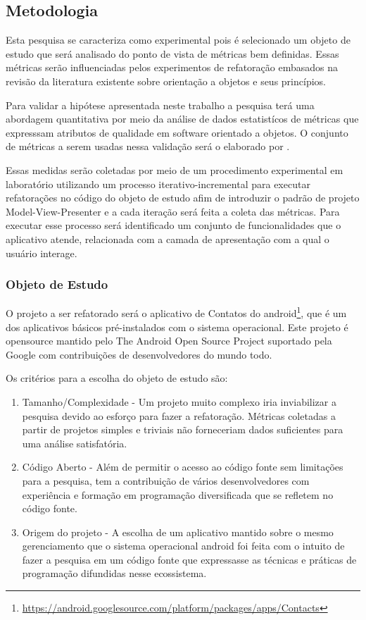 \documentclass[conference]{IEEEtran}
\begin{document}
\subsection{Metodologia}

Esta pesquisa se caracteriza como experimental pois é selecionado um objeto
de estudo que será analisado do ponto de vista de métricas bem definidas. Essas
métricas serão influenciadas pelos experimentos de refatoração embasados na
revisão da literatura existente sobre orientação a objetos e seus princípios.

Para validar a hipótese apresentada neste trabalho a pesquisa terá uma
abordagem quantitativa por meio da análise de dados estatistícos de métricas 
que expresssam atributos de qualidade em software orientado a objetos. O
conjunto de métricas a serem usadas nessa validação será o elaborado por
\cite{cksuite}.

Essas medidas serão coletadas por meio de um procedimento experimental em
laboratório utilizando um processo iterativo-incremental para executar
refatorações no código do objeto de estudo afim de introduzir o padrão de
projeto Model-View-Presenter e a cada iteração será feita a coleta das
métricas. Para executar esse processo será identificado um conjunto de
funcionalidades que o aplicativo atende, relacionada com a camada de
apresentação com a qual o usuário interage.

\subsubsection{Objeto de Estudo}


O projeto a ser refatorado será o aplicativo de Contatos do
android\footnote{\url{https://android.googlesource.com/platform/packages/apps/Contacts}},
que é um dos aplicativos básicos pré-instalados com o sistema operacional. Este
projeto é opensource mantido pelo  The Android Open Source Project suportado
pela Google com contribuições de desenvolvedores do mundo todo.

Os critérios para a escolha do objeto de estudo são:

\begin{enumerate}
  \item Tamanho/Complexidade - Um projeto muito complexo iria inviabilizar a
  pesquisa devido ao esforço para fazer a refatoração. Métricas coletadas
  a partir de projetos simples e triviais não forneceriam dados suficientes para
  uma análise satisfatória.
  \item Código Aberto - Além de permitir o acesso ao código fonte sem
  limitações para a pesquisa, tem a contribuição de vários desenvolvedores com
  experiência e formação em programação diversificada que se refletem no código fonte.
  \item Origem do projeto - A escolha de um aplicativo mantido sobre o mesmo
  gerenciamento que o sistema operacional android foi feita com o intuito de
  fazer a pesquisa em um código fonte que expressasse as técnicas e práticas de
  programação difundidas nesse ecossistema.
\end{enumerate}
\end{document}
